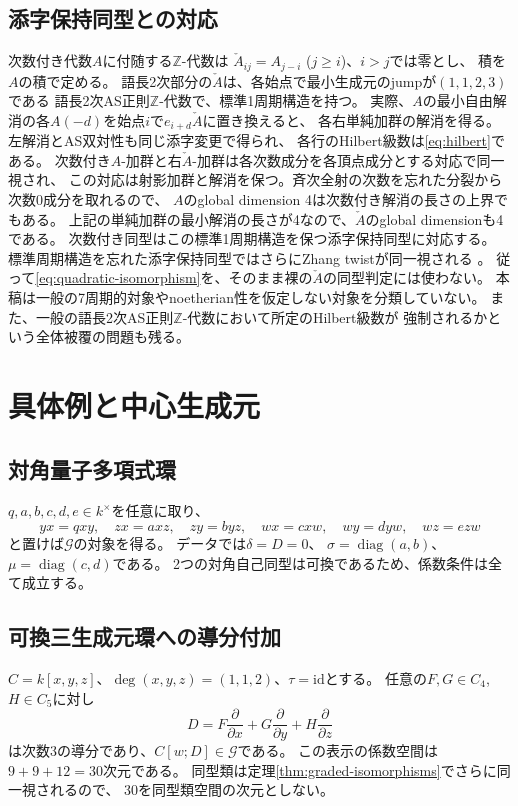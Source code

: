 \documentclass[11pt,a4paper]{ltjsarticle}
\theoremstyle{definition}
\newcommand{\ZZ}{\mathbb Z}
\newcommand{\Gclass}{\mathcal G}
\begin{document}
\subsection{添字保持同型との対応}
次数付き代数$A$に付随する$\ZZ$-代数は
$\check A_{ij}=A_{j-i}$ ($j\geq i$)、$i>j$では零とし、
積を$A$の積で定める。
語長2次部分の$\check A$は、各始点で最小生成元のjumpが$(1,1,2,3)$である
語長2次AS正則$\ZZ$-代数で、標準1周期構造を持つ。
実際、$A$の最小自由解消の各$A(-d)$を始点$i$で$e_{i+d}\check A$に置き換えると、
各右単純加群の解消を得る。左解消とAS双対性も同じ添字変更で得られ、
各行のHilbert級数は\eqref{eq:hilbert}である。
次数付き$A$-加群と右$\check A$-加群は各次数成分を各頂点成分とする対応で同一視され、
この対応は射影加群と解消を保つ。斉次全射の次数を忘れた分裂から次数0成分を取れるので、
$A$のglobal dimension 4は次数付き解消の長さの上界でもある。
上記の単純加群の最小解消の長さが4なので、$\check A$のglobal dimensionも4である。
次数付き同型はこの標準1周期構造を保つ添字保持同型に対応する。
標準周期構造を忘れた添字保持同型ではさらにZhang twistが同一視される
\cite[Theorem~1.2]{Sierra}。
従って\eqref{eq:quadratic-isomorphism}を、そのまま裸の$\check A$の同型判定には使わない。
本稿は一般の7周期的対象やnoetherian性を仮定しない対象を分類していない。
また、一般の語長2次AS正則$\ZZ$-代数において所定のHilbert級数が
強制されるかという全体被覆の問題も残る。

\section{具体例と中心生成元}
\subsection{対角量子多項式環}
$q,a,b,c,d,e\in k^\times$を任意に取り、
\[
yx=qxy,\quad zx=axz,\quad zy=byz,\quad
wx=cxw,\quad wy=dyw,\quad wz=ezw
\]
と置けば$\Gclass$の対象を得る。
データでは$\delta=D=0$、
$\sigma=\operatorname{diag}(a,b)$、
$\mu=\operatorname{diag}(c,d)$である。
2つの対角自己同型は可換であるため、係数条件は全て成立する。

\subsection{可換三生成元環への導分付加}
$C=k[x,y,z]$、$\deg(x,y,z)=(1,1,2)$、$\tau=\mathrm{id}$とする。
任意の$F,G\in C_4$, $H\in C_5$に対し
\[
D=F\frac{\partial}{\partial x}
 +G\frac{\partial}{\partial y}
 +H\frac{\partial}{\partial z}
\]
は次数3の導分であり、$C[w;D]\in\Gclass$である。
この表示の係数空間は$9+9+12=30$次元である。
同型類は定理\ref{thm:graded-isomorphisms}でさらに同一視されるので、
30を同型類空間の次元としない。
\end{document}
